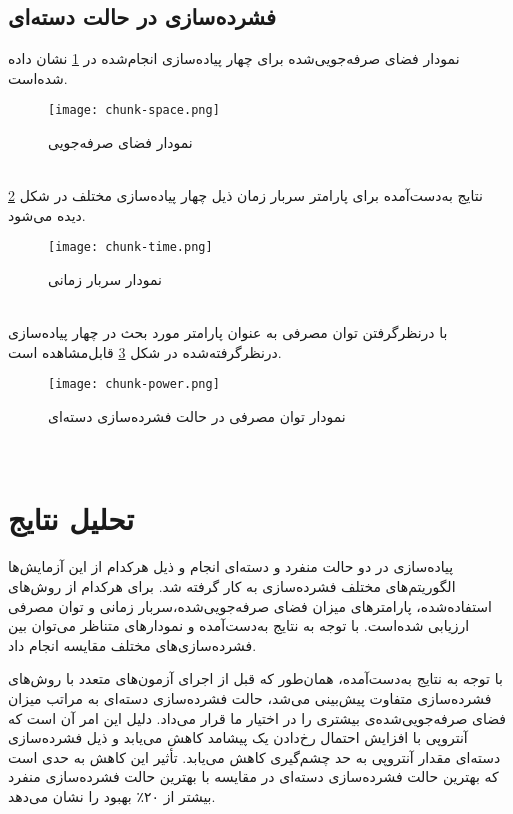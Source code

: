 \subsection{فشرده‌سازی در حالت دسته‌ای}


نمودار فضای صرفه‌جویی‌شده برای چهار پیاده‌سازی انجام‌شده در
\ref{fig:chunk-space}
نشان داده شده‌است.
\begin{figure}[ht]
	\centerline{\texttt{[image: chunk-space.png]}}
	\caption{نمودار فضای صرفه‌جویی}
	\label{fig:chunk-space}
\end{figure}\\

نتایج به‌دست‌آمده برای پارامتر سربار زمان ذیل چهار پیاده‌سازی مختلف در شکل
\ref{fig:chunk-time}
دیده می‌شود.
\begin{figure}[ht]
	\centerline{\texttt{[image: chunk-time.png]}}
	\caption{نمودار سربار زمانی}
	\label{fig:chunk-time}
\end{figure}\\

با درنظرگرفتن توان مصرفی به عنوان پارامتر مورد بحث در چهار پیاده‌سازی درنظرگرفته‌شده در شکل
\ref{fig:chunk-power}
قابل‌مشاهده است.
\begin{figure}[ht]
	\centerline{\texttt{[image: chunk-power.png]}}
	\caption{ نمودار توان مصرفی در حالت فشرده‌سازی دسته‌ای}
	\label{fig:chunk-power}
\end{figure}\\



\section{تحلیل نتایج}

پیاده‌سازی در دو حالت منفرد و دسته‌ای انجام و ذیل هرکدام از این آزمایش‌ها الگوریتم‌های مختلف فشرده‌سازی به کار گرفته شد. برای هرکدام از روش‌های استفاده‌شده، پارامترهای میزان فضای صرفه‌جویی‌شده،‌سربار زمانی و توان مصرفی ارزیابی شده‌است. با توجه به نتایج به‌دست‌آمده و نمودارهای متناظر می‌توان بین فشرده‌سازی‌های مختلف مقایسه انجام داد. 

با توجه به نتایج به‌دست‌آمده، همان‌طور که قبل از اجرای آزمون‌های متعدد با روش‌های فشرده‌سازی متفاوت پیش‌بینی می‌شد، حالت فشرده‌سازی دسته‌ای به مراتب میزان فضای صرفه‌جویی‌شده‌ی بیشتری را در اختیار ما قرار می‌داد. دلیل این امر آن است که آنتروپی با افزایش احتمال رخ‌دادن یک پیشامد کاهش می‌یابد و ذیل فشرده‌سازی دسته‌ای مقدار آنتروپی به حد چشم‌گیری کاهش می‌یابد. تأثیر این کاهش به حدی ا‌ست که بهترین حالت فشرده‌سازی دسته‌ای در مقایسه با بهترین حالت فشرده‌سازی منفرد بیشتر از ۲۰٪ بهبود را نشان می‌دهد.

